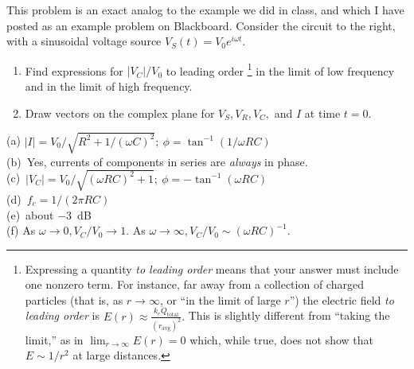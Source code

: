 \begin{Exercise}
\label{prob_RCcircuit_AC}
This problem is an exact analog to the example we did in class, and which I have posted as an example problem on Blackboard.  Consider the circuit to the right, with a sinusoidal voltage source $V_S (t)=V_0 e^{i\omega t}.$  
\begin{enumerate}[label=(\alph*),nosep,start=6]
\item Find expressions for $ \left| V_C \right| / V_0$ to leading order%
\footnote{Expressing a quantity \textit{to leading order} means that your answer must include one nonzero term.
For instance, far away from a collection of charged particles (that is, as $r \to \infty$, or ``in the limit of large $r$'') the electric field \textit{to leading order} is 
${\displaystyle  E(r)\approx \frac{k_e  Q_\text{total} }{(r_\text{avg})^2} }.$
This is slightly different from ``taking the limit,'' as in $\displaystyle\lim_{r \to \infty} E(r)=0$ which, while true, does not show that $E\sim 1/r^2$ at large distances.
}
in the limit of low frequency and in the limit of high frequency.
\item Draw vectors on the complex plane for $V_S, V_R, V_C,$ and $I$ at time $t=0$.
\end{enumerate}

\end{Exercise}
\begin{Answer}
(a) $|I|=V_0/\sqrt{R^2+1/(\omega C)^2 };~\phi=\tan^{-1}(1/\omega RC)$  \\
(b)~Yes, currents of components in series are \textit{always} in phase.\\
(c)~$|V_C |=V_0/\sqrt{(\omega RC)^2+1};~\phi=-\tan^{-1}(\omega RC) $\\
(d)~$f_c=1 / (2 \pi RC)$ \\
(e)~about $-3$~dB \\
(f) As $\omega \to 0, V_C/V_0 \to 1$. As $\omega \to \infty, V_C/V_0 \sim (\omega RC)^{-1}.$  
\end{Answer}


